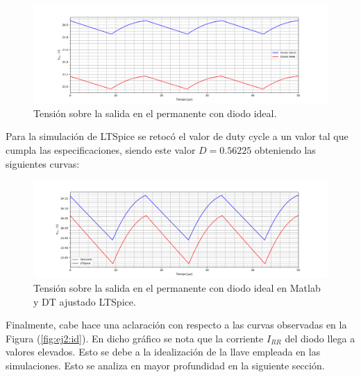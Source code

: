 \begin{figure}[H]
	\centering
	\includegraphics[width=0.9\linewidth]{ImagenesEjercicio-2/vo_diodo_ideal.png}
	\caption{Tensión sobre la salida en el permanente con diodo ideal.}
	\label{fig:ej2:vo_diodo_ideal}
\end{figure}
Para la simulación de LTSpice se retocó el valor de duty cycle a un valor tal que cumpla las especificaciones, siendo este valor $D=0.56225$ obteniendo las siguientes curvas:
\begin{figure}[H]
	\centering
	\includegraphics[width=0.9\linewidth]{ImagenesEjercicio-2/vo_duty_ideal.png}
	\caption{Tensión sobre la salida en el permanente con diodo ideal en Matlab y DT ajustado LTSpice.}
	\label{fig:ej2:vo_diodo_ideal_ltspice}
\end{figure}

Finalmente, cabe hace una aclaración con respecto a las curvas observadas en la Figura (\ref{fig:ej2:id}). En dicho gráfico se nota que la corriente $I_{RR}$ del diodo llega a valores elevados. Esto se debe a la idealización de la llave empleada en las simulaciones. Esto se analiza en mayor profundidad en la siguiente sección.

%
